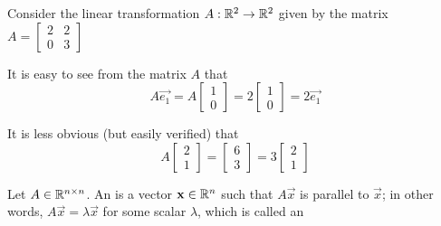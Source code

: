 
\begin{applicationActivities}{3}{27}

\begin{observation}
Consider the linear transformation $A : \mathbb{R}^2 \rightarrow \mathbb{R}^2$ given by the matrix $A = \begin{bmatrix} 2 & 2 \\ 0 & 3 \end{bmatrix}$

\begin{center}
\end{center}
It is easy to see from the matrix $A$ that  $$A\vec{e_1} = A\begin{bmatrix}1 \\ 0 \end{bmatrix} = 2 \begin{bmatrix}1 \\ 0 \end{bmatrix} = 2 \vec{e_1}$$

It is less obvious (but easily verified) that
$$A\begin{bmatrix} 2 \\ 1 \end{bmatrix} = \begin{bmatrix} 6 \\ 3 \end{bmatrix} = 3\begin{bmatrix} 2 \\ 1 \end{bmatrix}$$
\end{observation}

\begin{definition}Let $A \in \mathbb{R}^{n \times n}$.
An  is a vector $\mathbf{x} \in \mathbb{R}^n$ such that $A\vec{x}$ is parallel to $\vec{x}$; in other words, $A\vec{x}=\lambda \vec{x}$ for some scalar $\lambda$, which is called an 
\end{definition}


\end{applicationActivities}
